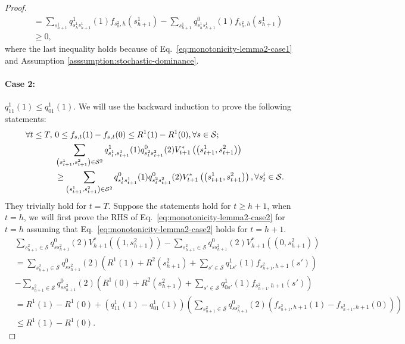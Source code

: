 \begin{proof}
\begin{align*}
    &=\sum_{s_{h+1}^1}q^1_{s_h^1s_{h+1}^1}(1)f_{s_{h}^2,h}\left(s_{h+1}^1\right)-\sum_{s_{h+1}^1}q^0_{s_h^1s_{h+1}^1}(1)f_{s_{h}^2,h}\left(s_{h+1}^1\right)\\
    &\geq 0,
\end{align*}
where the last inequality holds because of Eq.~\eqref{eq:monotonicity-lemma2-case1} and Assumption \ref{asssumption:stochastic-dominance}.
\paragraph{Case 2:} $q^1_{11}(1)\leq q^1_{01}(1)$. We will use the backward induction to prove the following statements:
\begin{align}
    \forall t\leq T,~&0\leq f_{s,t}(1)-f_{s,t}(0)\leq R^1(1)-R^1(0),\forall s\in\mathcal{S};\label{eq:monotonicity-lemma2-case2}\\
    &\sum_{\left(s_{t+1}^1,s_{t+1}^2\right)\in\mathcal{S}^2}q^1_{s_t^1,s_{t+1}^1}(1)q^0_{s_t^2s_{t+1}^2}(2)V_{t+1}^*\left(\left(s_{t+1}^1,s_{t+1}^2\right)\right)\notag\\&\geq\sum_{\left(s_{t+1}^1,s_{t+1}^2\right)\in\mathcal{S}^2}q^0_{s_t^1s_{t+1}^1}(1)q^0_{s_t^2s_{t+1}^2}(2)V_{t+1}^*\left(\left(s_{t+1}^1,s_{t+1}^2\right)\right),\forall s_t^i\in\mathcal{S}.\label{eq:optimality-lemma2-case2}
\end{align}
They trivially hold for $t=T$. Suppose the statements hold for $t\geq h+1$, when $t=h$, we will first prove the RHS of Eq.~\eqref{eq:monotonicity-lemma2-case2} for $t=h$ assuming that Eq.~\eqref{eq:monotonicity-lemma2-case2} holds for $t=h+1$.
      \begin{align*}
       & \sum_{s_{h+1}^2\in\mathcal{S}}q^0_{ss_{h+1}^2}(2)V_{h+1}^*\left(\left(1,s_{h+1}^2\right)\right)-\sum_{s_{h+1}^2\in\mathcal{S}}q^0_{ss_{h+1}^2}(2)V_{h+1}^*\left(\left(0,s_{h+1}^2\right)\right)\\
       &=\sum_{s_{h+1}^2\in\mathcal{S}}q^0_{ss_{h+1}^2}(2)\left(R^1(1)+R^2(s_{h+1}^2)+\sum_{s'\in\mathcal{S}}q^1_{1s'}(1)f_{s_{h+1}^2,h+1}(s')\right)\\
       &-\sum_{s_{h+1}^2\in\mathcal{S}}q^0_{ss_{h+1}^2}(2)\left(R^1(0)+R^2(s_{h+1}^2)+\sum_{s'\in\mathcal{S}}q^1_{0s'}(1)f_{s_{h+1}^2,h+1}(s')\right)\\
       &=R^1(1)-R^1(0)+\left(q^1_{11}(1)-q^1_{01}(1)\right)\left(\sum_{s_{h+1}^2\in\mathcal{S}}q^0_{ss_{h+1}^2}(2)\left(f_{s_{h+1}^2,h+1}(1)-f_{s_{h+1}^2,h+1}(0)\right)\right)\\
       &\leq R^1(1)-R^1(0).
    \end{align*}


\end{proof}
